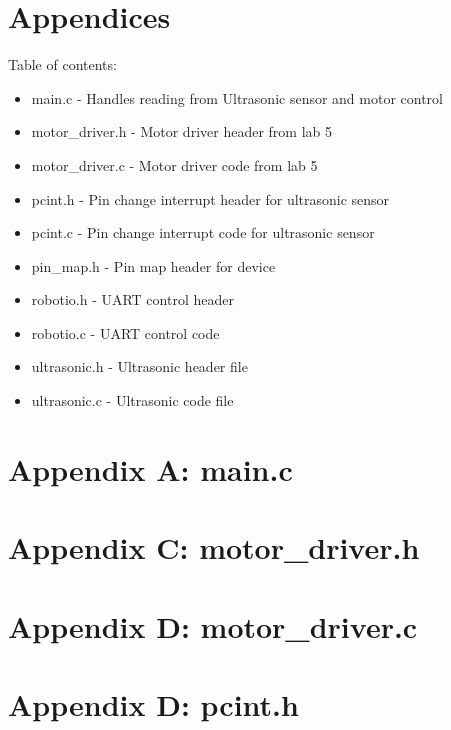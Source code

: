 \documentclass[letterpaper,11pt]{texMemo} %
\begin{document}
\section*{Appendices}
Table of contents:
\begin{itemize}
    \item main.c - Handles reading from Ultrasonic sensor and motor control
    \item motor\_driver.h - Motor driver header from lab 5
    \item motor\_driver.c - Motor driver code from lab 5
    \item pcint.h - Pin change interrupt header for ultrasonic sensor
    \item pcint.c - Pin change interrupt code for ultrasonic sensor
    \item pin\_map.h - Pin map header for device
    \item robotio.h - UART control header
    \item robotio.c - UART control code
    \item ultrasonic.h - Ultrasonic header file
    \item ultrasonic.c - Ultrasonic code file
\end{itemize}
\newpage

\section*{Appendix A: main.c}
\begin{tiny}

\end{tiny}
\newpage

\section*{Appendix C: motor\_driver.h}
\begin{tiny}

\end{tiny}
\newpage

\section*{Appendix D: motor\_driver.c}
\begin{tiny}

\end{tiny}
\newpage

\section*{Appendix D: pcint.h}
\begin{tiny}

\end{tiny}
\newpage
\end{document}
